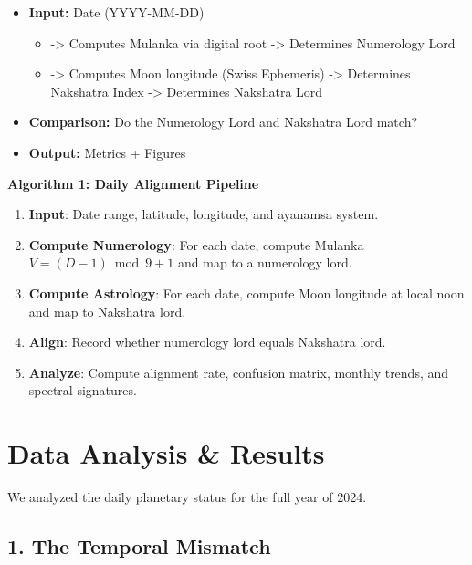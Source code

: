 \documentclass[
  11pt,
  a4paper,
  oneside,
  openany]{article}
\providecommand{\tightlist}{%
  \setlength{\itemsep}{0pt}\setlength{\parskip}{0pt}}\usepackage{longtable,booktabs,array}
\begin{document}
\begin{itemize}
\tightlist
\item
  \textbf{Input:} Date (YYYY-MM-DD)

  \begin{itemize}
  \tightlist
  \item
    -\textgreater{} Computes Mulanka via digital root -\textgreater{}
    Determines Numerology Lord
  \item
    -\textgreater{} Computes Moon longitude (Swiss Ephemeris)
    -\textgreater{} Determines Nakshatra Index -\textgreater{}
    Determines Nakshatra Lord
  \end{itemize}
\item
  \textbf{Comparison:} Do the Numerology Lord and Nakshatra Lord match?
\item
  \textbf{Output:} Metrics + Figures
\end{itemize}

\textbf{Algorithm 1: Daily Alignment Pipeline}

\begin{enumerate}
\def\labelenumi{\arabic{enumi}.}
\tightlist
\item
  \textbf{Input}: Date range, latitude, longitude, and ayanamsa system.
\item
  \textbf{Compute Numerology}: For each date, compute Mulanka
  \(V = (D-1) \bmod 9 + 1\) and map to a numerology lord.
\item
  \textbf{Compute Astrology}: For each date, compute Moon longitude at
  local noon and map to Nakshatra lord.
\item
  \textbf{Align}: Record whether numerology lord equals Nakshatra lord.
\item
  \textbf{Analyze}: Compute alignment rate, confusion matrix, monthly
  trends, and spectral signatures.
\end{enumerate}

\section{Data Analysis \& Results}\label{data-analysis-results}

We analyzed the daily planetary status for the full year of 2024.

\subsection{1. The Temporal Mismatch}\label{the-temporal-mismatch}
\end{document}
